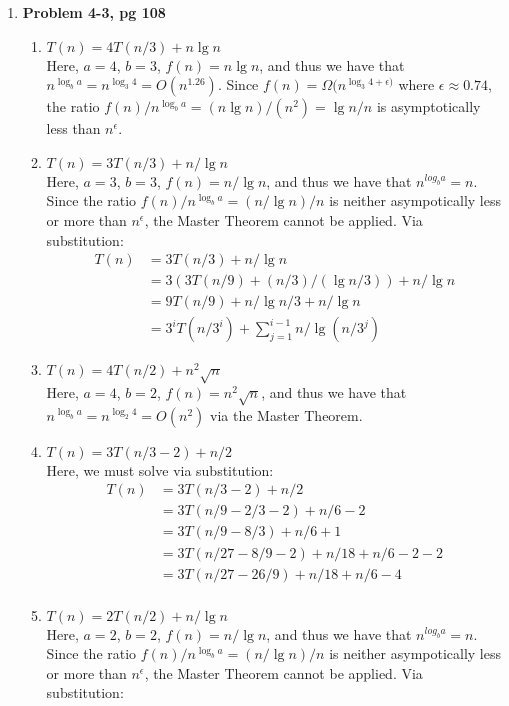 \documentclass{article}
\begin{document}
\begin{enumerate}
\item \textbf{Problem 4-3, pg 108}
\begin{enumerate}
\item $T(n) = 4T(n/3) + n\lg{n}$ \\
Here, $a=4$, $b=3$, $f(n)=n\lg{n}$, and thus we have that $n^{\log_{b}{a}} = n^{\log_{3}{4}} = O(n^{1.26})$. Since $f(n) = \Omega(n^{\log_{3}{4}+\epsilon)}$ where $\epsilon \approx 0.74$, the ratio $f(n)/n^{\log_{b}{a}} = (n\lg{n})/(n^{2}) = \lg{n}/n$ is asymptotically less than $n^{\epsilon}$.
\item $T(n) = 3T(n/3) + n/\lg{n}$ \\
Here, $a=3$, $b=3$, $f(n)=n/\lg{n}$, and thus we have that $n^{log_{b}{a}} = n$. Since the ratio $f(n)/n^{\log_{b}{a}} = (n/\lg{n})/n$ is neither asympotically less or more than $n^{\epsilon}$, the Master Theorem cannot be applied. Via substitution:
\begin{align*}
T(n) &= 3T(n/3) + n/\lg{n} \\
& = 3(3T(n/9) + (n/3)/(\lg{n/3})) + n/\lg{n} \\
& = 9T(n/9) + n/\lg{n/3} + n/\lg{n} \\
& = 3^{i}T(n/3^{i}) + \sum_{j=1}^{i-1}{n/\lg(n/3^{j})}
\end{align*}
\item $T(n) = 4T(n/2) + n^{2}\sqrt{n}$ \\
Here, $a=4$, $b=2$, $f(n)=n^{2}\sqrt{n}$, and thus we have that $n^{\log_{b}{a}} = n^{\log_{2}{4}} = O(n^2)$ via the Master Theorem.
\item $T(n) = 3T(n/3 - 2) + n/2$ \\ 
Here, we must solve via substitution:
\begin{align*}
T(n) &= 3T(n/3 - 2) + n/2 \\
&= 3T(n/9 - 2/3 -2) + n/6 - 2 \\
&= 3T(n/9 - 8/3) + n/6 + 1 \\
&= 3T(n/27 - 8/9 - 2) + n/18 + n/6 - 2 - 2 \\
&= 3T(n/27 - 26/9) + n/18 + n/6 - 4 \\
\end{align*}
\item $T(n) = 2T(n/2) + n/\lg{n}$ \\
Here, $a=2$, $b=2$, $f(n)=n/\lg{n}$, and thus we have that $n^{log_{b}{a}} = n$. Since the ratio $f(n)/n^{\log_{b}{a}} = (n/\lg{n})/n$ is neither asympotically less or more than $n^{\epsilon}$, the Master Theorem cannot be applied. Via substitution:
\begin{align*}

\end{align*}
\end{enumerate}
\end{enumerate}
\end{document}
